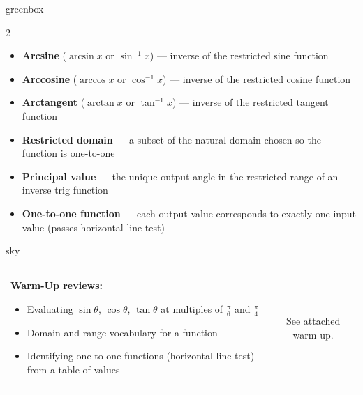 \documentclass[10pt]{article}
\begin{document}
\begin{skillbox}{greenbox}
\begin{multicols}{2}
\begin{itemize}[leftmargin=1.4em, itemsep=2pt]
    \item \textbf{Arcsine} ($\arcsin x$ or $\sin^{-1}x$) --- inverse of the
          restricted sine function
    \item \textbf{Arccosine} ($\arccos x$ or $\cos^{-1}x$) --- inverse of the
          restricted cosine function
    \item \textbf{Arctangent} ($\arctan x$ or $\tan^{-1}x$) --- inverse of the
          restricted tangent function
    \item \textbf{Restricted domain} --- a subset of the natural domain chosen
          so the function is one-to-one
    \item \textbf{Principal value} --- the unique output angle in the
          restricted range of an inverse trig function
    \item \textbf{One-to-one function} --- each output value corresponds to
          exactly one input value (passes horizontal line test)
\end{itemize}
\end{multicols}
\end{skillbox}

\begin{skillbox}{sky}
\begin{tabularx}{\linewidth}{@{}X c@{}}
    \begin{minipage}[t]{0.60\linewidth}\vspace{0pt}
        \textbf{Warm-Up reviews:}
        \begin{itemize}[leftmargin=1.4em, itemsep=2pt]
            \item Evaluating $\sin\theta$, $\cos\theta$, $\tan\theta$ at
                  multiples of $\tfrac{\pi}{6}$ and $\tfrac{\pi}{4}$
            \item Domain and range vocabulary for a function
            \item Identifying one-to-one functions (horizontal line test)
                  from a table of values
        \end{itemize}
    \end{minipage}
    &
    \begin{minipage}[t]{0.34\linewidth}\vspace{0pt}\centering
        See attached warm-up.
    \end{minipage}
\end{tabularx}
\end{skillbox}
\end{document}

